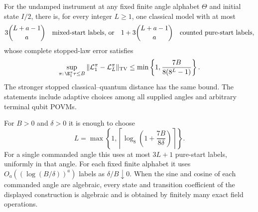 \begin{corollary}
\label{cor:r76-qubit-polylog}
For the undamped instrument at any fixed finite angle alphabet $\Theta$
and initial state $I/2$, there is, for every integer $L\ge1$, one classical
model with at most
\begin{equation}\label{eq:r76-qubit-count}
 3\binom{L+a-1}{a}
 \quad\hbox{mixed-start labels, or}\quad
 1+3\binom{L+a-1}{a}
 \quad\hbox{counted pure-start labels},
\end{equation}
whose complete stopped-law error satisfies
\begin{equation}\label{eq:r76-qubit-error}
 \sup_{\pi:\,\E_1^\pi\tau\le B}
 \|\mathcal L_1^\pi-\mathcal L_L^\pi\|_{\rm TV}
 \le \min\left\{1,\frac{7B}{8(8^L-1)}\right\}.
\end{equation}
The stronger stopped classical--quantum distance has the same bound.
The statements include adaptive choices among all supplied angles and
arbitrary terminal qubit POVMs.

For $B>0$ and $\delta>0$ it is enough to choose
\begin{equation}\label{eq:r76-qubit-depth}
 L=\max\left\{1,
   \left\lceil\log_8\left(1+\frac{7B}{8\delta}\right)\right\rceil\right\}.
\end{equation}
For a single commanded angle this uses at most $3L+1$ pure-start labels,
uniformly in that angle.  For each fixed finite alphabet it uses
$O_a((\log(B/\delta))^a)$ labels as $\delta/B\downarrow0$.
When the sine and cosine of each commanded angle are algebraic, every
state and transition coefficient of the displayed construction is
algebraic and is obtained by finitely many exact field operations.
\end{corollary}
